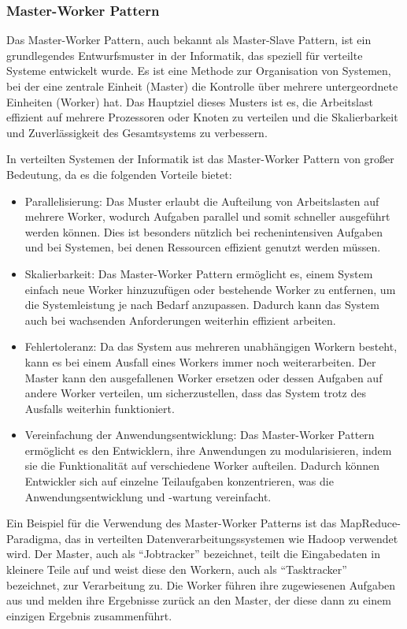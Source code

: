 \subsubsection{Master-Worker Pattern}
Das Master-Worker Pattern, auch bekannt als Master-Slave Pattern, ist ein grundlegendes Entwurfsmuster in der Informatik, das speziell für verteilte Systeme entwickelt wurde. Es ist eine Methode zur Organisation von Systemen, bei der eine zentrale Einheit (Master) die Kontrolle über mehrere untergeordnete Einheiten (Worker) hat. Das Hauptziel dieses Musters ist es, die Arbeitslast effizient auf mehrere Prozessoren oder Knoten zu verteilen und die Skalierbarkeit und Zuverlässigkeit des Gesamtsystems zu verbessern.

In verteilten Systemen der Informatik ist das Master-Worker Pattern von großer Bedeutung, da es die folgenden Vorteile bietet:
\begin{itemize} 
\item Parallelisierung: Das Muster erlaubt die Aufteilung von Arbeitslasten auf mehrere Worker, wodurch Aufgaben parallel und somit schneller ausgeführt werden können. Dies ist besonders nützlich bei rechenintensiven Aufgaben und bei Systemen, bei denen Ressourcen effizient genutzt werden müssen.
\item Skalierbarkeit: Das Master-Worker Pattern ermöglicht es, einem System einfach neue Worker hinzuzufügen oder bestehende Worker zu entfernen, um die Systemleistung je nach Bedarf anzupassen. Dadurch kann das System auch bei wachsenden Anforderungen weiterhin effizient arbeiten.
\item Fehlertoleranz: Da das System aus mehreren unabhängigen Workern besteht, kann es bei einem Ausfall eines Workers immer noch weiterarbeiten. Der Master kann den ausgefallenen Worker ersetzen oder dessen Aufgaben auf andere Worker verteilen, um sicherzustellen, dass das System trotz des Ausfalls weiterhin funktioniert.
\item Vereinfachung der Anwendungsentwicklung: Das Master-Worker Pattern ermöglicht es den Entwicklern, ihre Anwendungen zu modularisieren, indem sie die Funktionalität auf verschiedene Worker aufteilen. Dadurch können Entwickler sich auf einzelne Teilaufgaben konzentrieren, was die Anwendungsentwicklung und -wartung vereinfacht.
\end{itemize}    

Ein Beispiel für die Verwendung des Master-Worker Patterns ist das MapReduce-Paradigma, das in verteilten Datenverarbeitungssystemen wie Hadoop verwendet wird. Der Master, auch als \enquote{Jobtracker} bezeichnet, teilt die Eingabedaten in kleinere Teile auf und weist diese den Workern, auch als \enquote{Tasktracker} bezeichnet, zur Verarbeitung zu. Die Worker führen ihre zugewiesenen Aufgaben aus und melden ihre Ergebnisse zurück an den Master, der diese dann zu einem einzigen Ergebnis zusammenführt.

